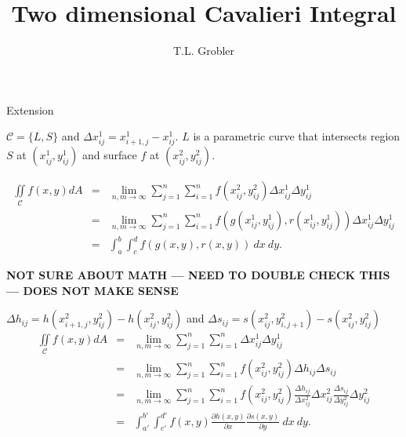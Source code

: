\documentclass[a4paper,10pt]{article}
\title{Two dimensional Cavalieri Integral}
\author{T.L. Grobler}
\begin{document}
\maketitle

\begin{section}{Extension}

$\mathcal{C} = \{L,S\}$ and $\Delta x_{ij}^1 = x_{i+1,j}^1 - x_{ij}^1$. $L$ is a parametric curve that intersects region $S$ at $(x_{ij}^1,y_{ij}^1)$ and surface 
$f$ at $(x_{ij}^2,y_{ij}^2)$.


\begin{eqnarray}
\iint\limits_{\!\mathcal{C}} f(x,y) dA &=& \lim_{n,m\rightarrow \infty} \sum_{j=1}^n\sum_{i=1}^n f(x_{ij}^2,y_{ij}^2) \Delta x_{ij}^1\Delta y_{ij}^1\\
&=&  \lim_{n,m\rightarrow \infty} \sum_{j=1}^n\sum_{i=1}^n f(g(x_{ij}^1,y_{ij}^1),r(x_{ij}^1,y_{ij}^1)) \Delta x_{ij}^1\Delta y_{ij}^1\\
&=& \int_a^b\int_c^d f(g(x,y),r(x,y))~dx~dy.
\end{eqnarray}

\noindent
\textbf{NOT SURE ABOUT MATH --- NEED TO DOUBLE CHECK THIS --- DOES NOT MAKE SENSE}


$\Delta h_{ij} = h(x_{i+1,j}^2,y_{ij}^2) - h(x_{ij}^2,y_{ij}^2)$ and $\Delta s_{ij} = s(x_{ij}^2,y_{i,j+1}^2) - s(x_{ij}^2,y_{ij}^2)$ 
\begin{eqnarray}
\iint\limits_{\!\mathcal{C}} f(x,y) dA &=& \lim_{n,m\rightarrow \infty} \sum_{j=1}^n\sum_{i=1}^n  \Delta x_{ij}^1\Delta y_{ij}^1\\
&=&  \lim_{n,m\rightarrow \infty} \sum_{j=1}^n\sum_{i=1}^n f(x_{ij}^2,y_{ij}^2) \Delta h_{ij}\Delta s_{ij}\\
&=&  \lim_{n,m\rightarrow \infty} \sum_{j=1}^n\sum_{i=1}^n f(x_{ij}^2,y_{ij}^2) \frac{\Delta h_{ij}}{\Delta x_{ij}^2}\Delta x_{ij}^2 \frac{\Delta s_{ij}}{\Delta y_{ij}^2}\Delta y_{ij}^2\\
&=& \int_{a'}^{b'}\int_{c'}^{d'} f(x,y)\frac{\partial h(x,y)}{\partial x}\frac{\partial s(x,y)}{\partial y}~dx~dy.
\end{eqnarray}

\end{section}
\end{document}
